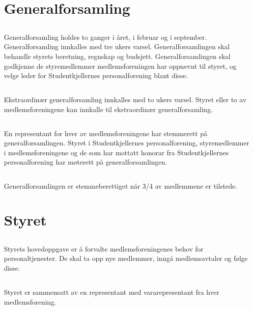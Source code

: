 \documentclass[11pt]{article}
\begin{document}
\section{Generalforsamling}
\label{sec:4}
\subsection{}
\label{sub:4.1}
Generalforsamling holdes to ganger i året, i februar og i september.
Generalforsamling innkalles med tre ukers varsel. 
Generalforsamlingen skal behandle styrets beretning, regnskap og budsjett. 
Generalforsamlingen skal godkjenne de styremedlemmer medlemsforeningen 
har oppnevnt til styret, 
og velge leder for Studentkjellernes personalforening blant disse.
\subsection{}
\label{sub:4.2}
Ekstraordinær generalforsamling innkalles med to ukers varsel. 
Styret eller to av medlemsforeningene kan innkalle til ekstraordinær generalforsamling.
\subsection{}
\label{sub:4.3}
En representant for hver av medlemsforeningene har stemmerett på generalforsamlingen.
Styret i Studentkjellernes personalforening, styremedlemmer i medlemsforeningene
og de som har mottatt honorar fra Studentkjellernes personalforening har møterett på
generalforsamlingen.
\subsection{}
\label{sub:4.4}
Generalforsamlingen er stemmeberettiget når 3/4 av medlemmene er tilstede.
\section{Styret}
\label{sec:5}
\subsection{}
\label{sub:5.1}
Styrets hovedoppgave er å forvalte medlemsforeningenes behov for personaltjenester.
De skal ta opp nye medlemmer, inngå medlemsavtaler og følge disse.
\subsection{}
\label{sub:5.2}
Styret er sammensatt av en representant med vararepresentant fra hver medlemsforening.
\end{document}
